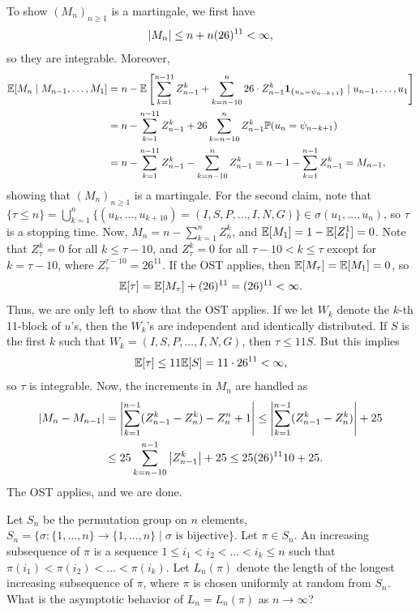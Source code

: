 To show $(M_{n})_{n \geq 1}$ is a martingale, we first have
\begin{align}
    \left| M_{n} \right| \leq n + n(26)^{11} < \infty,
\end{align}
so they are integrable. Moreover,
\begin{align}
    \mathbb{E}[M_{n} \mid M_{n-1},\ldots,M_{1}] &= n - \mathbb{E}\left[ \sum_{k=1}^{n-11} Z_{n-1}^{k} + \sum_{k=n-10}^{n}26 \cdot Z_{n-1}^{k} \textbf{1}_{\{u_{n}=\psi_{n-k+1}\}} \mid u_{n-1},\ldots,u_{1} \right] \notag \\
    &= n - \sum_{k=1}^{n-11} Z_{n-1}^{k} + 26\sum_{k=n-10}^{n} Z_{n-1}^{k} \mathbb{P}(u_{n} = \psi_{n-k+1}) \notag \\
    &= n - \sum_{k=1}^{n-11} Z_{n-1}^{k} - \sum_{k=n-10}^{n} Z_{n-1}^{k} = n-1-\sum_{k=1}^{n-1}Z_{n-1}^{k} = M_{n-1},
\end{align}
showing that $(M_{n})_{n \geq 1}$ is a martingale. For the second claim, note that $\{\tau \leq n\} = \bigcup_{k=1}^{n}\{(u_{k},\ldots,u_{k+10}) = (I,S,P,\ldots,I,N,G)\} \in \sigma(u_{1},\ldots,u_{n})$, so $\tau$ is a stopping time. Now, $M_{n} = n-\sum_{k=1}^{n} Z_{n}^{k}$, and $\mathbb{E}[M_{1}] = 1 - \mathbb{E}[Z_{1}^{1}] = 0$. Note that $Z_{\tau}^{k} = 0$ for all $k \leq \tau-10$, and $Z_{\tau}^{k} = 0$ for all $\tau-10 < k \leq \tau$ except for $k = \tau-10$, where $Z_{\tau}^{\tau-10} = 26^{11}$. If the OST applies, then $\mathbb{E}[M_{\tau}] = \mathbb{E}[M_{1}] = 0$, so
\begin{align}
    \mathbb{E}[\tau] = \mathbb{E}[M_{\tau}] + (26)^{11} = (26)^{11} < \infty.
\end{align}
Thus, we are only left to show that the OST applies. If we let $W_{k}$ denote the $k$-th 11-block of $u$'s, then the $W_{k}$'s are independent and identically distributed. If $S$ is the first $k$ such that $W_{k} = (I,S,P,\ldots,I,N,G)$, then $\tau \leq 11S$. But this implies
\begin{align}
    \mathbb{E}[\tau] \leq 11\mathbb{E}[S] = 11 \cdot 26^{11} < \infty,
\end{align}
so $\tau$ is integrable. Now, the increments in $M_{n}$ are handled as
\begin{align}
    \left| M_{n}-M_{n-1} \right| &= \left| \sum_{k=1}^{n-1}(Z_{n-1}^{k}-Z_{n}^{k})-Z_{n}^{n}+1 \right| \leq \left| \sum_{k=1}^{n-1}(Z_{n-1}^{k}-Z_{n}^{k}) \right| + 25 \notag \\ &\leq 25\sum_{k=n-10}^{n-1}\left| Z_{n-1}^{k} \right| + 25 \leq 25(26)^{11}10+25.
\end{align}
The OST applies, and we are done.

\begin{example}
    Let $S_{n}$ be the permutation group on $n$ elements, $S_{n} = \{\sigma: \{1,\ldots,n\} \to \{1,\ldots,n\} \mid \sigma \text{ is bijective}\}$. Let $\pi \in S_{n}$. An increasing subsequence of $\pi$ is a sequence $1 \leq i_{1} < i_{2} < \ldots < i_{k} \leq n$ such that $\pi(i_{1}) < \pi(i_{2}) < \ldots < \pi(i_{k})$. Let $L_{n}(\pi)$ denote the length of the longest increasing subsequence of $\pi$, where $\pi$ is chosen uniformly at random from $S_{n}$. What is the asymptotic behavior of $L_{n} = L_{n}(\pi)$ as $n \to \infty$?
\end{example}

